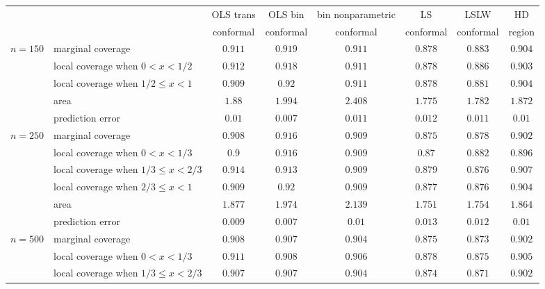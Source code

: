 \documentclass[11pt]{article}\usepackage[]{graphicx}\usepackage[]{color}
\begin{document}
\begin{table}[h!]
\scriptsize
\begin{center}
\begin{tabular}{llcccccc}
  & & OLS trans & OLS bin   & bin nonparametric & LS        & LSLW      & HD     \\
  & & conformal & conformal & conformal         & conformal & conformal & region \\ 
  $n = 150$
    & marginal coverage &
  $0.911$ & 
  $0.919$ & 
  $0.911$ & 
  $0.878$ & 
  $0.883$ & 
  $0.904$ \\
    & local coverage when $0 < x < 1/2$ & 
  $0.912$ & 
  $0.918$ & 
  $0.911$ & 
  $0.878$ & 
  $0.886$ & 
  $0.903$ \\
    & local coverage when $1/2 \leq x < 1$ & 
  $0.909$ & 
  $0.92$ & 
  $0.911$ & 
  $0.878$ & 
  $0.881$ & 
  $0.904$ \\
    & area &
  $1.88$ & 
  $1.994$ & 
  $2.408$ & 
  $1.775$ & 
  $1.782$ & 
  $1.872$ \\
    & prediction error &
  $0.01$ & 
  $0.007$ & 
  $0.011$ & 
  $0.012$ & 
  $0.011$ & 
  $0.01$ \\
  \hline
  $n = 250$  
    & marginal coverage &
  $0.908$ & 
  $0.916$ & 
  $0.909$ & 
  $0.875$ & 
  $0.878$ & 
  $0.902$ \\
    & local coverage when $0 < x < 1/3$ & 
  $0.9$ & 
  $0.916$ & 
  $0.909$ & 
  $0.87$ & 
  $0.882$ & 
  $0.896$ \\
    & local coverage when $1/3 \leq x < 2/3$ & 
  $0.914$ & 
  $0.913$ & 
  $0.909$ & 
  $0.879$ & 
  $0.876$ & 
  $0.907$ \\
    & local coverage when $2/3 \leq x < 1$ &
  $0.909$ & 
  $0.92$ & 
  $0.909$ & 
  $0.877$ & 
  $0.876$ & 
  $0.904$ \\
    & area & 
  $1.877$ & 
  $1.974$ & 
  $2.139$ & 
  $1.751$ & 
  $1.754$ & 
  $1.864$ \\
    & prediction error & 
  $0.009$ & 
  $0.007$ & 
  $0.01$ & 
  $0.013$ & 
  $0.012$ & 
  $0.01$ \\
  \hline
  $n = 500$
    & marginal coverage &
  $0.908$ & 
  $0.907$ & 
  $0.904$ & 
  $0.875$ & 
  $0.873$ & 
  $0.902$ \\
    & local coverage when $0 < x < 1/3$ & 
  $0.911$ & 
  $0.908$ & 
  $0.906$ & 
  $0.878$ & 
  $0.875$ & 
  $0.905$ \\
    & local coverage when $1/3 \leq x < 2/3$ & 
  $0.907$ & 
  $0.907$ & 
  $0.904$ & 
  $0.874$ & 
  $0.871$ & 
  $0.902$ \\

\end{tabular}
\end{center}
\end{table}
\end{document}
